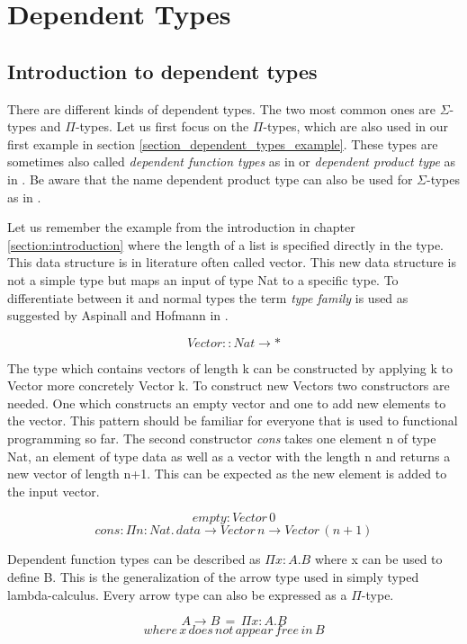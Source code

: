 \section{Dependent Types}
\subsection{Introduction to dependent types}
There are different kinds of dependent types. The two most common ones are $\Sigma$-types and $\Pi$-types.
Let us first focus on the $\Pi$-types, which are also used in our first example in section \ref{section_dependent_types_example}. These types are sometimes also called \emph{dependent function types} as in \cite{10.1145/2841316} or \emph{dependent product type} as in \cite{10.5555/1076265}. Be aware that the name dependent product type can also be used for $\Sigma$-types as in \cite{10.1145/2841316}.

Let us remember the example from the introduction in chapter \ref{section:introduction} where the length of a list is specified directly in the type. This data structure is in literature \cite{10.1145/2841316} \cite{10.5555/1076265} often called vector.
This new data structure is not a simple type but maps an input of type Nat to a specific type. To differentiate between it and normal types the term \emph{type family} is used as suggested by Aspinall and Hofmann in \cite{10.5555/1076265}.

$$Vector :: Nat \rightarrow *$$

The type which contains vectors of length k can be constructed by applying k to Vector more concretely Vector k.
To construct new Vectors two constructors are needed. One which constructs an empty vector and one to add new elements to the vector. This pattern should be familiar for everyone that is used to functional programming so far.
The second constructor \emph{cons} takes one element n of type Nat, an element of type data as well as a vector with the length n and returns a new vector of length n+1. This can be expected as the new element is added to the input vector. 

$$empty: Vector \, 0$$
$$cons : \Pi n : Nat. \, data \rightarrow Vector \, n \rightarrow Vector \, (n+1)$$

Dependent function types can be described as $\Pi x : A. B$ where x can be used to define B. 
This is the generalization of the arrow type used in simply typed lambda-calculus. Every arrow type can also be expressed as a $\Pi$-type.

$$A \rightarrow B \, = \, \Pi x:A.B$$
$$where \, x \, does \, not \, appear \, free \, in \, B$$

